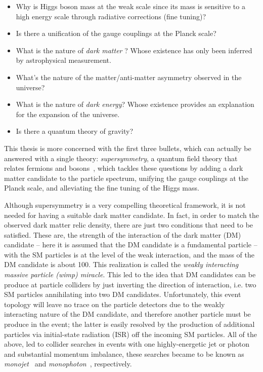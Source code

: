 \begin{itemize}
\item Why is Higgs boson mass at the weak scale since its mass is
  sensitive to a high energy scale through radiative corrections (fine
  tuning)?
\item Is there a unification of the gauge couplings at the Planck scale?
\item What is the nature of \textit{dark matter} ? Whose existence
  has only been inferred by astrophysical measurement.
\item What's the nature of the matter/anti-matter asymmetry observed
  in the universe?
\item  What is the nature of \textit{dark energy}? Whose existence provides an
  explanation for the expansion of the universe.
\item Is there a quantum theory of gravity?
\end{itemize} 

This thesis is more concerned with the first three bullets, which can
actually be answered with a single theory: \textit{supersymmetry}, a
quantum field theory that relates fermions and bosons~\cite{susy1,susy2,susy3,susy4,susy5,susy6,susy7}, which tackles
these questions by adding a dark matter candidate to the
particle spectrum, unifying the gauge couplings at the Planck scale,
and alleviating the fine tuning of the Higgs mass.

Although supersymmetry is a very compelling theoretical framework, it is not needed for having
a suitable dark matter candidate. In fact, in order to match
the observed dark matter relic density, there are just two
conditions that need to be satisfied. These are, the strength of the interaction of the dark matter (DM)
candidate -- here it is assumed that the DM candidate is a fundamental
particle -- with the SM particles is at the level of the weak interaction,
and the mass of the DM candidate is about 100\GeV. This realization is
called the \textit{weakly interacting massive particle (wimp)
  miracle}. This led to the idea that DM candidates can be
produce at particle colliders by just inverting the direction of
interaction, i.e. two SM particles annihilating into two DM
candidates. Unfortunately, this event topology will leave no trace on the particle
detectors due to the weakly interacting nature of the DM candidate,
and therefore another particle must be produce in the event; the latter is
easily resolved by the production of additional particles via
initial-state radiation (ISR) off the incoming SM
particles. All of the above, led to collider searches in events with one highly-energetic jet
or photon and substantial momentum imbalance, these searches became to
be known as \textit{monojet}~\cite{Aad:2011xw,Chatrchyan:2012me} and
\textit{monophoton}~\cite{Khachatryan:2014rwa,Aad:2014tda},
respectively.

